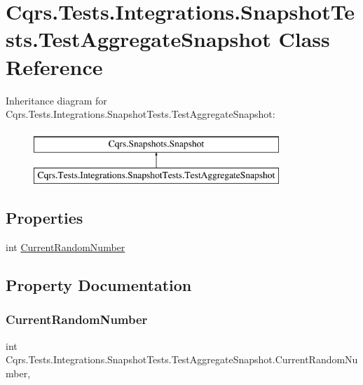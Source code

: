 \hypertarget{classCqrs_1_1Tests_1_1Integrations_1_1SnapshotTests_1_1TestAggregateSnapshot}{}\section{Cqrs.\+Tests.\+Integrations.\+Snapshot\+Tests.\+Test\+Aggregate\+Snapshot Class Reference}
\label{classCqrs_1_1Tests_1_1Integrations_1_1SnapshotTests_1_1TestAggregateSnapshot}
Inheritance diagram for Cqrs.\+Tests.\+Integrations.\+Snapshot\+Tests.\+Test\+Aggregate\+Snapshot\+:\begin{figure}[H]
\begin{center}
\leavevmode
\includegraphics[height=2.000000cm]{classCqrs_1_1Tests_1_1Integrations_1_1SnapshotTests_1_1TestAggregateSnapshot}
\end{center}
\end{figure}
\subsection*{Properties}
\begin{DoxyCompactItemize}
\item 
int \hyperlink{classCqrs_1_1Tests_1_1Integrations_1_1SnapshotTests_1_1TestAggregateSnapshot_af3e9cca6524adc6ad8c91333a978999a_af3e9cca6524adc6ad8c91333a978999a}{Current\+Random\+Number}
\end{DoxyCompactItemize}


\subsection{Property Documentation}
\mbox{\label{classCqrs_1_1Tests_1_1Integrations_1_1SnapshotTests_1_1TestAggregateSnapshot_af3e9cca6524adc6ad8c91333a978999a_af3e9cca6524adc6ad8c91333a978999a}} 
\subsubsection{\texorpdfstring{Current\+Random\+Number}{CurrentRandomNumber}}
{\footnotesize\ttfamily int Cqrs.\+Tests.\+Integrations.\+Snapshot\+Tests.\+Test\+Aggregate\+Snapshot.\+Current\+Random\+Number\hspace{0.3cm}{\ttfamily [get]}, {\ttfamily [set]}}

